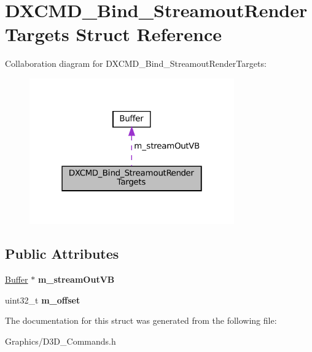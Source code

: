 \hypertarget{structDXCMD__Bind__StreamoutRenderTargets}{}\section{D\+X\+C\+M\+D\+\_\+\+Bind\+\_\+\+Streamout\+Render\+Targets Struct Reference}
\label{structDXCMD__Bind__StreamoutRenderTargets}


Collaboration diagram for D\+X\+C\+M\+D\+\_\+\+Bind\+\_\+\+Streamout\+Render\+Targets\+:
\nopagebreak
\begin{figure}[H]
\begin{center}
\leavevmode
\includegraphics[width=250pt]{structDXCMD__Bind__StreamoutRenderTargets__coll__graph}
\end{center}
\end{figure}
\subsection*{Public Attributes}
\begin{DoxyCompactItemize}
\item 
\mbox{\label{structDXCMD__Bind__StreamoutRenderTargets_a07e7077f875267b31964a47717b6ac05}} 
\hyperlink{classBuffer}{Buffer} $\ast$ {\bfseries m\+\_\+stream\+Out\+VB}
\item 
\mbox{\label{structDXCMD__Bind__StreamoutRenderTargets_a9e32ee219606748786d5a7c2ba6fd077}} 
uint32\+\_\+t {\bfseries m\+\_\+offset}
\end{DoxyCompactItemize}


The documentation for this struct was generated from the following file\+:\begin{DoxyCompactItemize}
\item 
Graphics/D3\+D\+\_\+\+Commands.\+h\end{DoxyCompactItemize}
